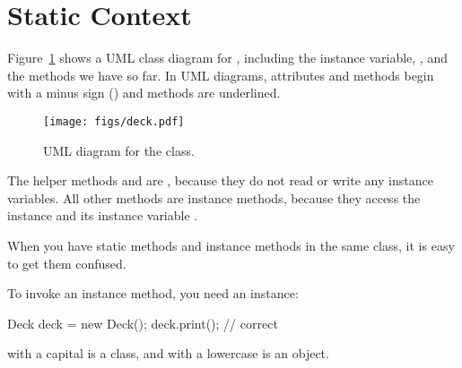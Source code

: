 %



\section{Static Context}

Figure~\ref{fig.deck} shows a UML class diagram for , including the instance variable, , and the methods we have so far.
In UML diagrams,  attributes and methods begin with a minus sign (\java{-}) and  methods are underlined.


\begin{figure}[!ht]
\begin{center}
\texttt{[image: figs/deck.pdf]}
\caption{UML diagram for the  class.}
\label{fig.deck}
\end{center}
\end{figure}

The helper methods  and  are , because they do not read or write any instance variables.
All other methods are instance methods, because they access the instance  and its instance variable .

When you have static methods and instance methods in the same class, it is easy to get them confused.

To invoke an instance method, you need an instance:

\begin{code}
Deck deck = new Deck();
deck.print();  // correct
\end{code}

 with a capital  is a class, and  with a lowercase  is an object.

